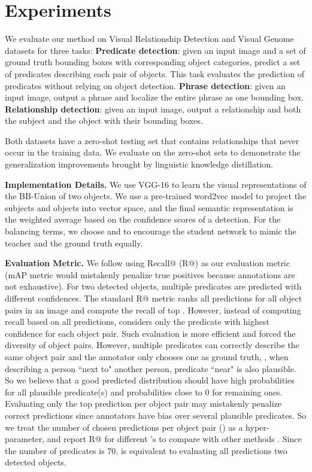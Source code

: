 \section{Experiments}\label{exp}
We evaluate our method on Visual Relationship Detection \cite{VRD} and Visual Genome \cite{VG} datasets for three tasks:
\textbf{Predicate detection}: given an input image and a set of ground truth bounding boxes with corresponding object categories, predict a set of predicates describing each pair of objects. This task evaluates the prediction of predicates without relying on object detection. 
\textbf{Phrase detection}: given an input image, output a phrase  and localize the entire phrase as one bounding box.
\textbf{Relationship detection}: given an input image, output a relationship  and both the subject and the object with their bounding boxes.



Both datasets have a zero-shot testing set that contains relationships that never occur in the training data. We evaluate on the zero-shot sets to demonstrate the generalization improvements brought by linguistic knowledge distillation.

\textbf{Implementation Details.} We use VGG-16 \cite{VGG} to learn the visual representations of the BB-Union of two objects. 
We use a pre-trained word2vec \cite{word2vec}  model to project the subjects and objects into vector space, and the final semantic representation is the weighted average based on the confidence scores of a detection. For the balancing terms, we choose  and  to encourage the student network to mimic the teacher and the ground truth equally.

\textbf{{Evaluation Metric.}} We follow \cite{VRD,UIUC} using Recall@ (R@) as our evaluation metric (mAP metric would mistakenly penalize true positives because annotations are not exhaustive).
For two detected objects, multiple predicates are predicted with different confidences. The standard R@ metric ranks all predictions for all object pairs in an image and compute the recall of top . However, instead of computing recall based on all predictions, \cite{VRD} considers only the predicate with highest confidence for each object pair. 
Such evaluation is more efficient and forced the diversity of object pairs. 
However, multiple predicates can correctly describe the same object pair and the annotator only chooses one as ground truth, \eg, when describing a person ``next to" another person, predicate ``near" is also plausible.
So we believe that a good predicted distribution should have high probabilities for all plausible predicate(s) and probabilities close to 0 for remaining ones.  Evaluating only the top prediction per object pair may mistakenly penalize correct predictions since annotators have bias over several plausible predicates. 
So we treat the number of chosen predictions per object pair () as a hyper-parameter, and report R@ for different 's to compare with other methods \cite{VRD,UIUC,VisualPhrase}. Since the number of predicates is 70,  is equivalent to evaluating all predictions \wrt two detected objects. 





